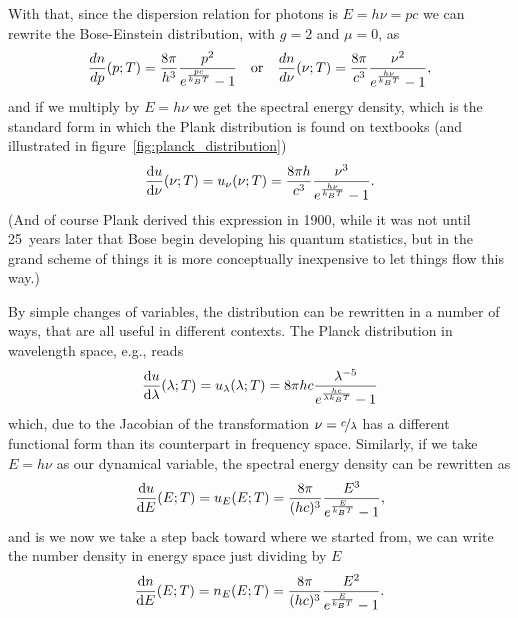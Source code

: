 With that, since the dispersion relation for photons is $E = h\nu = pc$
we can rewrite the Bose-Einstein distribution, with $g = 2$ and $\mu = 0$, as
\begin{align*}
  \frac{dn}{dp}(p; T) =
  \frac{8\pi}{h^3} \frac{p^2}{e^\frac{pc}{k_B T} - 1} \quad\text{or}\quad
  \frac{dn}{d\nu}(\nu; T) =
  \frac{8\pi}{c^3} \frac{\nu^2}{e^\frac{h\nu}{k_B T} - 1},
\end{align*}
and if we multiply by $E = h\nu$ we get the spectral energy density,
which is the standard form in which the Plank distribution is found on textbooks
(and illustrated in figure~\ref{fig:planck_distribution})
\begin{align}\label{eq:planck_spec_density_nu}
  \dv{u}{\nu}{(\nu; T)} = u_\nu(\nu; T) =
  \frac{8\pi h}{c^3} \frac{\nu^3}{e^\frac{h\nu}{k_B T} - 1}.
\end{align}
(And of course Plank derived this expression in 1900, while it was not until
25~years later that Bose begin developing his quantum statistics, but in the grand
scheme of things it is more conceptually inexpensive to let things flow this way.)

By simple changes of variables, the distribution can be rewritten in a number of
ways, that are all useful in different contexts. The Planck distribution in wavelength
space, e.g., reads
\begin{align}\label{eq:planck_spec_density_lambda}
  \dv{u}{\lambda}{(\lambda; T)} = u_\lambda(\lambda; T) =
  8\pi h c \frac{\lambda^{-5}}{e^\frac{hc}{\lambda k_B T} - 1}
\end{align}
which, due to the Jacobian of the transformation $\nu = \nicefrac{c}{\lambda}$
has a different functional form than its counterpart in frequency space.
Similarly, if we take $E = h\nu$ as our dynamical variable, the spectral
energy density can be rewritten as
\begin{align}\label{eq:planck_spec_density_E}
  \dv{u}{E}{(E; T)} = u_E(E; T) =
  \frac{8\pi}{(hc)^3} \frac{E^3}{e^\frac{E}{k_B T} - 1},
\end{align}
and is we now we take a step back toward where we started from, we can write the
number density in energy space just dividing by $E$
\begin{align}
  \dv{n}{E}{(E; T)} = n_E(E; T) =
  \frac{8\pi}{(hc)^3} \frac{E^2}{e^\frac{E}{k_B T} - 1}.
\end{align}

